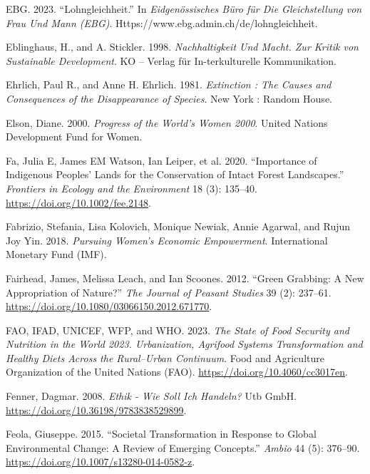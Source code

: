 \documentclass[
  a4paper,
  DIV=11,
  numbers=noendperiod,
  oneside,
  openany]{scrreprt}
\newlength{\cslhangindent}
\newenvironment{CSLReferences}[2] %
 {\begin{list}{}{%
  \setlength{\itemindent}{0pt}
  \setlength{\leftmargin}{0pt}
  \setlength{\parsep}{0pt}
  \ifodd #1
   \setlength{\leftmargin}{\cslhangindent}
   \setlength{\itemindent}{-1\cslhangindent}
  \fi
  \setlength{\itemsep}{#2\baselineskip}}}
 {\end{list}}
\begin{document}
\begin{CSLReferences}{1}{1}
EBG. 2023. {``Lohngleichheit.''} In \emph{Eidgen{ö}ssisches B{ü}ro f{ü}r
Die Gleichstellung von Frau Und Mann (EBG)}.
Https://www.ebg.admin.ch/de/lohngleichheit.

Eblinghaus, H., and A. Stickler. 1998. \emph{Nachhaltigkeit Und {Macht}.
{Zur Kritik} von {Sustainable Development}}. KO -- Verlag für
In-terkulturelle Kommunikation.

Ehrlich, Paul R., and Anne H. Ehrlich. 1981. \emph{Extinction : The
Causes and Consequences of the Disappearance of Species}. New York :
Random House.

Elson, Diane. 2000. \emph{Progress of the World's Women 2000}. United
Nations Development Fund for Women.

Fa, Julia E, James EM Watson, Ian Leiper, et al. 2020. {``Importance of
{Indigenous Peoples}' Lands for the Conservation of {Intact Forest
Landscapes}.''} \emph{Frontiers in Ecology and the Environment} 18 (3):
135--40. \url{https://doi.org/10.1002/fee.2148}.

Fabrizio, Stefania, Lisa Kolovich, Monique Newiak, Annie Agarwal, and
Rujun Joy Yin. 2018. \emph{Pursuing {Women}'s {Economic Empowerment}}.
International Monetary Fund (IMF).

Fairhead, James, Melissa Leach, and Ian Scoones. 2012. {``Green
{Grabbing}: A New Appropriation of Nature?''} \emph{The Journal of
Peasant Studies} 39 (2): 237--61.
\url{https://doi.org/10.1080/03066150.2012.671770}.

FAO, IFAD, UNICEF, WFP, and WHO. 2023. \emph{The {State} of {Food
Security} and {Nutrition} in the {World} 2023. {Urbanization}, Agrifood
Systems Transformation and Healthy Diets Across the Rural--Urban
Continuum}. {Food and Agriculture Organization of the United Nations
(FAO)}. \url{https://doi.org/10.4060/cc3017en}.

Fenner, Dagmar. 2008. \emph{Ethik - {Wie} Soll Ich Handeln?} Utb GmbH.
\url{https://doi.org/10.36198/9783838529899}.

Feola, Giuseppe. 2015. {``Societal Transformation in Response to Global
Environmental Change: {A} Review of Emerging Concepts.''} \emph{Ambio}
44 (5): 376--90. \url{https://doi.org/10.1007/s13280-014-0582-z}.


\end{CSLReferences}
\end{document}
